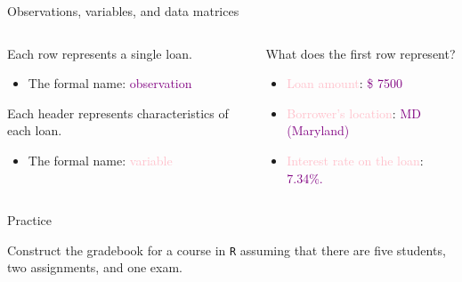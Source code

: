 \documentclass[notes,11pt, aspectratio=169]{beamer}
\newenvironment{wideitemize}{\itemize\addtolength{\itemsep}{10pt}}{\enditemize}
\begin{document}
\begin{frame}{Observations, variables, and data matrices}
\pause
\begin{columns}
\begin{column}{.5\textwidth}
\begin{minipage}[c][.3\textheight][c]{\linewidth}
\begin{wideitemize}
\small
\item Each row represents a single loan. 
     \begin{itemize}
     \item The formal name: \textcolor{purple}{observation}
     \end{itemize}
\pause
\item Each header represents characteristics of each loan.
      \begin{itemize}
      \item The formal name: \textcolor{pink}{variable}
      \end{itemize}
\end{wideitemize}
\end{minipage}
\end{column}
\hfill
\pause
\begin{column}{0.48\textwidth}
\begin{minipage}[c][.2\textheight][c]{\linewidth}
\begin{wideitemize}
\item What does the first row represent?
     \begin{itemize}
     \item \textcolor{pink}{Loan amount}: \textcolor{purple}{\$ 7500}
     \item \textcolor{pink}{Borrower's location}: \textcolor{purple}{MD (Maryland)}
     \item \textcolor{pink}{Interest rate on the loan}: \textcolor{purple}{7.34\%.}
     \end{itemize}
\end{wideitemize}
\end{minipage}
\end{column}
\end{columns}

\end{frame}

\begin{frame}{Practice}

\begin{center}
Construct the gradebook for a course in \texttt{R} assuming that there are five students, two assignments, and one exam.
\end{center}
\end{frame}
\end{document}
